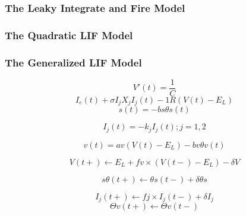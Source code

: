\subsubsection{The Leaky Integrate and Fire Model}


\subsubsection{The Quadratic LIF Model}
\subsubsection{The Generalized LIF Model}

\begin{equation}
V \prime (t)=\frac{1}{C} 
\end{equation}
\begin{equation}
I_{e}(t) + \sigma I_{j}X_{j}I_{j}(t) -1R(V (t)- E_{L})  \end{equation}
\begin{equation} 
s(t) = -bs \theta s(t)  
\end{equation}

\begin{equation}
I_{j}(t) = -k_{j} I_{j} (t); j = 1, 2  
\end{equation}

\begin{equation}
 v(t) = av(V (t) - E_{L}) - bv\theta v(t) 
\end{equation}

\begin{equation}
V (t+) \leftarrow E_{L} + fv \times (V (t-) - E_{L}) - \delta V 
\end{equation}

\begin{equation}
s \theta (t+) \leftarrow \theta s(t-) + \delta \theta s 
\end{equation}

\begin{equation}
I_{j} (t+) \leftarrow fj \times I_{j} (t-) + \delta I_{j}
\end{equation}
\begin{equation}
\Theta v (t+) \leftarrow \Theta v(t-) 
\end{equation}

